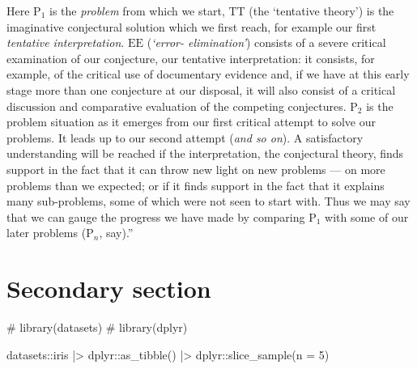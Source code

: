 \documentclass[
12pt,
openright,
oneside,
a4paper,
chapter=TITLE,
section=TITLE,
french,
spanish,
brazil,
english
]{abntex2}
\newenvironment{Shaded}{\begin{snugshade}}{\end{snugshade}}
\newcommand{\AttributeTok}[1]{\textcolor[rgb]{0.40,0.45,0.13}{#1}}
\newcommand{\CommentTok}[1]{\textcolor[rgb]{0.37,0.37,0.37}{#1}}
\newcommand{\DecValTok}[1]{\textcolor[rgb]{0.68,0.00,0.00}{#1}}
\newcommand{\FunctionTok}[1]{\textcolor[rgb]{0.28,0.35,0.67}{#1}}
\newcommand{\NormalTok}[1]{\textcolor[rgb]{0.00,0.23,0.31}{#1}}
\newcommand{\SpecialCharTok}[1]{\textcolor[rgb]{0.37,0.37,0.37}{#1}}
\begin{document}
Here \(\text{P}_{1}\) is the \emph{problem} from which we start,
\(\text{TT}\) (the `tentative theory') is the imaginative conjectural
solution which we first reach, for example our first \emph{tentative
interpretation}. \(\text{EE}\) (\emph{`error- elimination'}) consists of
a severe critical examination of our conjecture, our tentative
interpretation: it consists, for example, of the critical use of
documentary evidence and, if we have at this early stage more than one
conjecture at our disposal, it will also consist of a critical
discussion and comparative evaluation of the competing conjectures.
\(\text{P}_{2}\) is the problem situation as it emerges from our first
critical attempt to solve our problems. It leads up to our second
attempt (\emph{and so on}). A satisfactory understanding will be reached
if the interpretation, the conjectural theory, finds support in the fact
that it can throw new light on new problems --- on more problems than we
expected; or if it finds support in the fact that it explains many
sub-problems, some of which were not seen to start with. Thus we may say
that we can gauge the progress we have made by comparing
\(\text{P}_{1}\) with some of our later problems (\(\text{P}_{n}\),
say).''

\autocite[p.~164]{popper1979}

\begin{figure}
\end{figure}

\hypertarget{secondary-section}{%
\section{Secondary section}\label{secondary-section}}

\begin{Shaded}
\begin{Highlighting}[numbers=left,,]
\CommentTok{\# library(datasets)}
\CommentTok{\# library(dplyr)}

\NormalTok{datasets}\SpecialCharTok{::}\NormalTok{iris }\SpecialCharTok{|\textgreater{}}
\NormalTok{  dplyr}\SpecialCharTok{::}\FunctionTok{as\_tibble}\NormalTok{() }\SpecialCharTok{|\textgreater{}}
\NormalTok{  dplyr}\SpecialCharTok{::}\FunctionTok{slice\_sample}\NormalTok{(}\AttributeTok{n =} \DecValTok{5}\NormalTok{)}
\end{Highlighting}
\end{Shaded}
\end{document}
